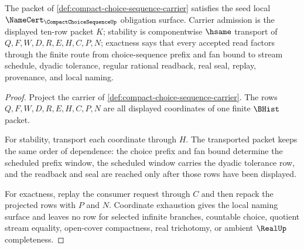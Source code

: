 \begin{theorem}
\label{thm:compact-choice-sequence-namecert-obligations}
The packet of \autoref{def:compact-choice-sequence-carrier} satisfies the seed local $\NameCert_{\CompactChoiceSequenceUp}$ obligation surface. Carrier admission is the displayed ten-row packet $K$; stability is componentwise $\hsame$ transport of $Q,F,W,D,R,E,H,C,P,N$; exactness says that every accepted read factors through the finite route from choice-sequence prefix and fan bound to stream schedule, dyadic tolerance, regular rational readback, real seal, replay, provenance, and local naming.
\end{theorem}
\begin{proof}
Project the carrier of \autoref{def:compact-choice-sequence-carrier}. The rows $Q,F,W,D,R,E,H,C,P,N$ are all displayed coordinates of one finite $\BHist$ packet.

For stability, transport each coordinate through $H$. The transported packet keeps the same order of dependence: the choice prefix and fan bound determine the scheduled prefix window, the scheduled window carries the dyadic tolerance row, and the readback and seal are reached only after those rows have been displayed.

For exactness, replay the consumer request through $C$ and then repack the projected rows with $P$ and $N$. Coordinate exhaustion gives the local naming surface and leaves no row for selected infinite branches, countable choice, quotient stream equality, open-cover compactness, real trichotomy, or ambient $\RealUp$ completeness.
\end{proof}

